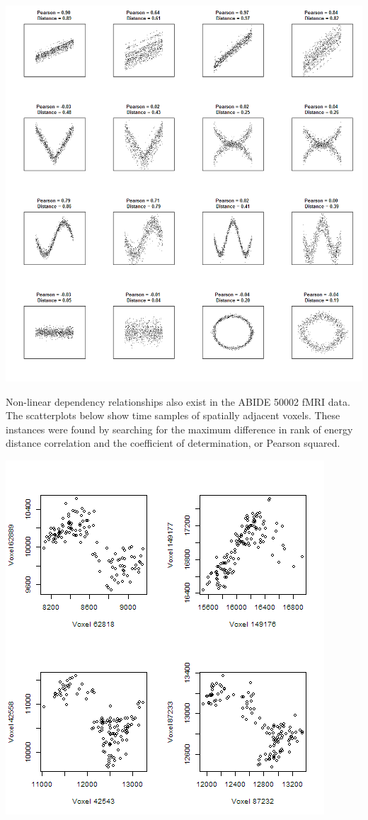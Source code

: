 \includegraphics[scale = 0.8]{figs/1_nonlinear_depend.png}

Non-linear dependency relationships also exist in the ABIDE 50002 fMRI
data. The scatterplots below show time samples of spatially adjacent
voxels. These instances were found by searching for the maximum
difference in rank of energy distance correlation and the coefficient
of determination, or Pearson squared.

\includegraphics[scale = 0.7]{figs/1_nonlinear_ABIDE_50002.png}

